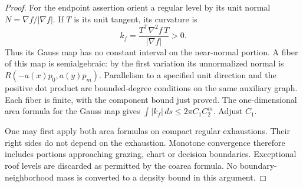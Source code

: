 \begin{proof}
For the endpoint assertion orient a regular level by its unit normal
$N=\nabla f/|\nabla f|$. If $T$ is its unit tangent, its curvature is
\begin{equation}\label{eq:v44-gauss-curvature}
 k_f=\frac{T^{\mathsf T}\nabla^2 f\,T}{|\nabla f|}>0.
\end{equation}
Thus its Gauss map has no constant interval on the near-normal portion.
A fiber of this map is semialgebraic: by the first variation its
unnormalized normal is
$R(-a(x)p_0,a(y)p_m)$. Parallelism to a specified unit direction and
the positive dot product are bounded-degree conditions on the same
auxiliary graph. Each fiber is finite, with the component bound just
proved. The one-dimensional area formula for the Gauss map gives
$\int |k_f|\,ds\le2\pi C_1C_2^m$. Adjust $C_1$.

One may first apply both area formulas on compact regular exhaustions.
Their right sides do not depend on the exhaustion. Monotone convergence
therefore includes portions approaching grazing, chart or decision
boundaries. Exceptional roof levels are discarded as permitted by the
coarea formula. No boundary-neighborhood mass is converted to a density
bound in this argument.
\end{proof}

